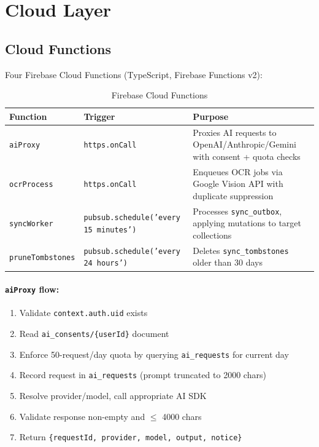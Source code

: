 \documentclass[12pt,a4paper,openany]{report}
\begin{document}
\section{Cloud Layer}

\subsection{Cloud Functions}

Four Firebase Cloud Functions (TypeScript, Firebase Functions v2):

\begin{table}[H]
\centering
\caption{Firebase Cloud Functions}
\label{tab:cloud-functions}
\begin{tabular}{llp{7cm}}
\toprule
\textbf{Function} & \textbf{Trigger} & \textbf{Purpose} \\
\midrule
\texttt{aiProxy} & \texttt{https.onCall} & Proxies AI requests to OpenAI/Anthropic/Gemini with consent + quota checks \\
\texttt{ocrProcess} & \texttt{https.onCall} & Enqueues OCR jobs via Google Vision API with duplicate suppression \\
\texttt{syncWorker} & \texttt{pubsub.schedule('every 15 minutes')} & Processes \texttt{sync\_outbox}, applying mutations to target collections \\
\texttt{pruneTombstones} & \texttt{pubsub.schedule('every 24 hours')} & Deletes \texttt{sync\_tombstones} older than 30 days \\
\bottomrule
\end{tabular}
\end{table}

\paragraph{\texttt{aiProxy} flow:}
\begin{enumerate}[leftmargin=*]
  \item Validate \texttt{context.auth.uid} exists
  \item Read \texttt{ai\_consents/\{userId\}} document
  \item Enforce 50-request/day quota by querying \texttt{ai\_requests} for current day
  \item Record request in \texttt{ai\_requests} (prompt truncated to 2000 chars)
  \item Resolve provider/model, call appropriate AI SDK
  \item Validate response non-empty and $\le$ 4000 chars
  \item Return \texttt{\{requestId, provider, model, output, notice\}}
\end{enumerate}
\end{document}
